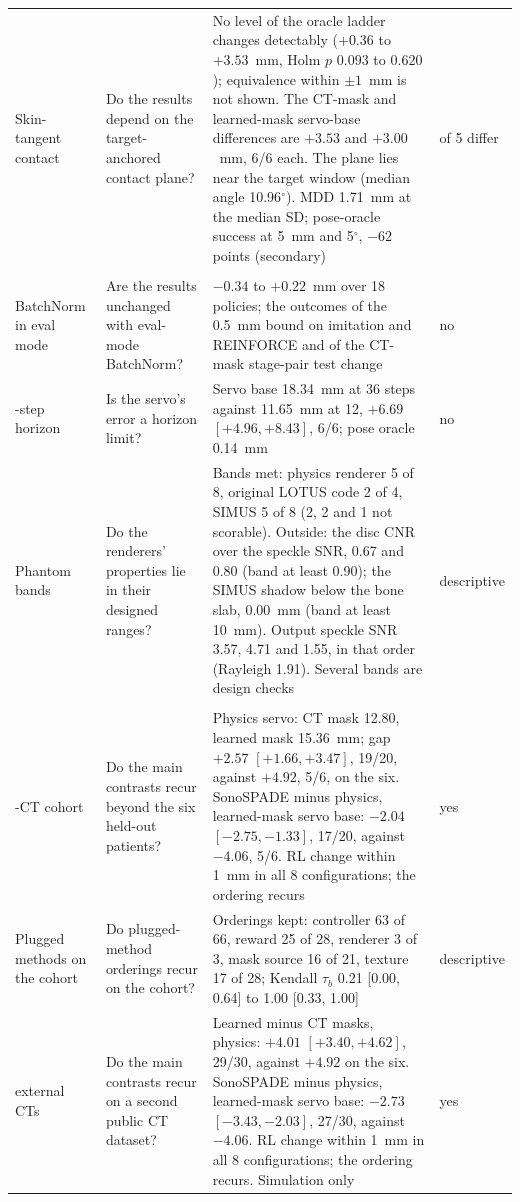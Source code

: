 \begin{table}[tp]
\begin{tabularx}{\textwidth}{@{}>{\raggedright\arraybackslash}p{} >{\raggedright\arraybackslash}p{} >{\raggedright\arraybackslash}X >{\raggedright\arraybackslash}p{}@{}}
Skin-tangent contact & Do the results depend on the target-anchored contact plane? & No level of the oracle ladder changes detectably ($+0.36$ to $+3.53$~mm, Holm $p$ $0.093$ to $0.620$); equivalence within $\pm 1$~mm is not shown. The CT-mask and learned-mask servo-base differences are $+3.53$ and $+3.00$~mm, 6/6 each. The plane lies near the target window (median angle 10.96$^\circ$). MDD 1.71~mm at the median SD; pose-oracle success at 5~mm and 5$^{\circ}$, $-62$ points (secondary) & 0 of 5 differ \\[1pt]
\addlinespace
\multicolumn{4}{@{}l}{\textit{Sensitivity}} \\
BatchNorm in eval mode & Are the results unchanged with eval-mode BatchNorm? & $-0.34$ to $+0.22$~mm over 18 policies; the outcomes of the 0.5~mm bound on imitation and REINFORCE and of the CT-mask stage-pair test change & no \\[1pt]
36-step horizon & Is the servo's error a horizon limit? & Servo base 18.34~mm at 36 steps against 11.65~mm at 12, $+6.69$ $[+4.96, +8.43]$, 6/6; pose oracle 0.14~mm & no \\[1pt]
Phantom bands & Do the renderers' properties lie in their designed ranges? & Bands met: physics renderer 5 of 8, original LOTUS code 2 of 4, SIMUS 5 of 8 (2, 2 and 1 not scorable). Outside: the disc CNR over the speckle SNR, 0.67 and 0.80 (band at least 0.90); the SIMUS shadow below the bone slab, 0.00~mm (band at least 10~mm). Output speckle SNR 3.57, 4.71 and 1.55, in that order (Rayleigh 1.91). Several bands are design checks & descriptive \\[1pt]
\addlinespace
\multicolumn{4}{@{}l}{\textit{Replication}} \\
20-CT cohort & Do the main contrasts recur beyond the six held-out patients? & Physics servo: CT mask 12.80, learned mask 15.36~mm; gap $+2.57$ $[+1.66, +3.47]$, 19/20, against $+4.92$, 5/6, on the six. SonoSPADE minus physics, learned-mask servo base: $-2.04$ $[-2.75, -1.33]$, 17/20, against $-4.06$, 5/6. RL change within 1~mm in all 8 configurations; the ordering recurs & yes \\[1pt]
Plugged methods on the cohort & Do plugged-method orderings recur on the cohort? & Orderings kept: controller 63 of 66, reward 25 of 28, renderer 3 of 3, mask source 16 of 21, texture 17 of 28; Kendall $\tau_b$ 0.21 [0.00, 0.64] to 1.00 [0.33, 1.00] & descriptive \\[1pt]
30 external CTs & Do the main contrasts recur on a second public CT dataset? & Learned minus CT masks, physics: $+4.01$ $[+3.40, +4.62]$, 29/30, against $+4.92$ on the six. SonoSPADE minus physics, learned-mask servo base: $-2.73$ $[-3.43, -2.03]$, 27/30, against $-4.06$. RL change within 1~mm in all 8 configurations; the ordering recurs. Simulation only & yes \\[1pt]
\bottomrule
\end{tabularx}
\end{table}
